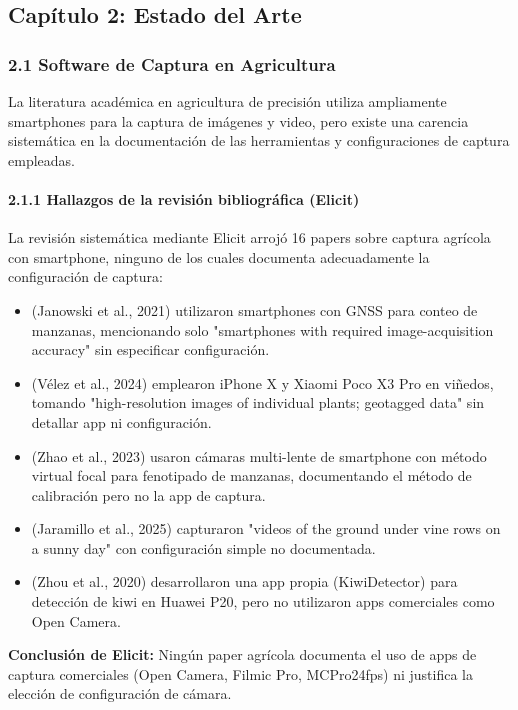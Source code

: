 \hline


\subsection{Capítulo 2: Estado del Arte}


\subsubsection{2.1 Software de Captura en Agricultura}


La literatura académica en agricultura de precisión utiliza ampliamente smartphones para la captura de imágenes y video, pero existe una carencia sistemática en la documentación de las herramientas y configuraciones de captura empleadas.


\paragraph{2.1.1 Hallazgos de la revisión bibliográfica (Elicit)}


La revisión sistemática mediante Elicit arrojó 16 papers sobre captura agrícola con smartphone, ninguno de los cuales documenta adecuadamente la configuración de captura:


\begin{itemize}
\item (Janowski et al., 2021) utilizaron smartphones con GNSS para conteo de manzanas, mencionando solo "smartphones with required image-acquisition accuracy" sin especificar configuración.
\item (Vélez et al., 2024) emplearon iPhone X y Xiaomi Poco X3 Pro en viñedos, tomando "high-resolution images of individual plants; geotagged data" sin detallar app ni configuración.
\item (Zhao et al., 2023) usaron cámaras multi-lente de smartphone con método virtual focal para fenotipado de manzanas, documentando el método de calibración pero no la app de captura.
\item (Jaramillo et al., 2025) capturaron "videos of the ground under vine rows on a sunny day" con configuración simple no documentada.
\item (Zhou et al., 2020) desarrollaron una app propia (KiwiDetector) para detección de kiwi en Huawei P20, pero no utilizaron apps comerciales como Open Camera.
\end{itemize}

\textbf{Conclusión de Elicit:} Ningún paper agrícola documenta el uso de apps de captura comerciales (Open Camera, Filmic Pro, MCPro24fps) ni justifica la elección de configuración de cámara.


